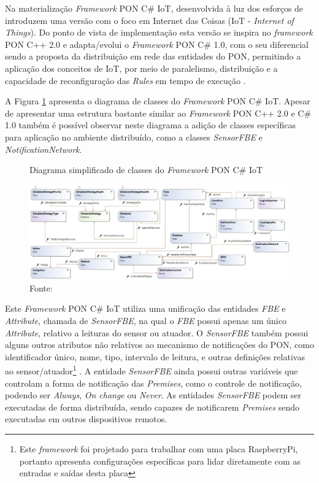 Na materialização \textit{Framework} PON C\# IoT, desenvolvida à luz dos
esforços de  introduzem uma versão com o foco em
Internet das Coisas (IoT - \textit{Internet of Things}). Do ponto de vista de
implementação esta versão se inspira no \textit{framework} PON C++ 2.0 e
adapta/evolui o \textit{Framework} PON C\# 1.0, com o seu diferencial sendo a
proposta da distribuição em rede das entidades do PON, permitindo a aplicação
dos conceitos de IoT, por meio de paralelismo, distribuição e a capacidade de
reconfiguração das \textit{Rules} em tempo de execução \cite{msc_oliveira_2019}.

A Figura \ref{fig:classes_pon_iot} apresenta o diagrama de classes do
\textit{Framework} PON C\# IoT. Apesar de apresentar uma estrutura bastante
similar ao \textit{Framework} PON C++ 2.0 e C\# 1.0 também é possível observar
neste diagrama a adição de classes específicas para aplicação no ambiente
distribuído, como a classes \textit{SensorFBE} e \textit{NotificationNetwork}.

\begin{figure}[!htb]
  \centering
  \caption{Diagrama simplificado de classes do \textit{Framework} PON C\# IoT}
  \includegraphics[width=\textwidth]{../figures/classes_pon_iot.png}
  \caption*{Fonte: }
  \label{fig:classes_pon_iot}
\end{figure}

Este \textit{Framework} PON C\# IoT utiliza uma unificação das entidades
\textit{FBE} e \textit{Attribute}, chamada de \textit{SensorFBE}, na qual o
\textit{FBE} possui apenas um único \textit{Attribute}, relativo a leituras do
sensor ou atuador. O \textit{SensorFBE} também possui alguns outros atributos
não relativos ao mecanismo de notificações do PON, como identificador único,
nome, tipo, intervalo de leitura, e outras definições relativas ao
sensor/atuador\footnote{Este \textit{framework} foi projetado para trabalhar com
uma placa RaspberryPi, portanto apresenta configurações específicas para lidar
diretamente com as entradas e saídas desta placa} \cite{msc_oliveira_2019}. A
entidade \textit{SensorFBE} ainda possui outras variáveis que controlam a forma
de notificação das \textit{Premises}, como o controle de notificação, podendo
ser \textit{Always}, \textit{On change} ou \textit{Never}. As entidades
\textit{SensorFBE} podem ser executadas de forma distribuída, sendo capazes de
notificarem \textit{Premises} sendo executadas em outros dispositivos remotos.

